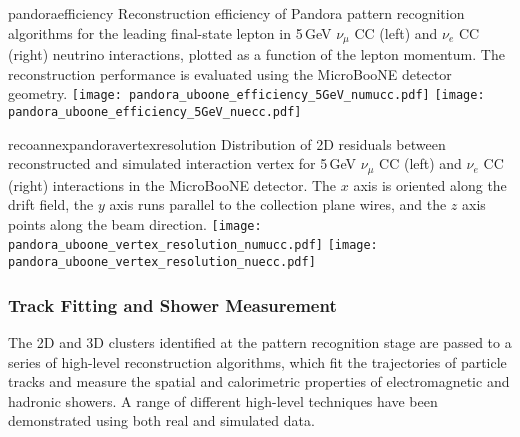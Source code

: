 \begin{cdrfigure}{pandoraefficiency}
{Reconstruction efficiency of Pandora pattern recognition algorithms
 for the leading final-state lepton in 5\,GeV $\nu_{\mu}$ CC (left) and
 $\nu_{e}$ CC (right) neutrino interactions, plotted as a function of
 the lepton momentum. The reconstruction performance is evaluated
 using the MicroBooNE detector geometry. }
\texttt{[image: pandora\_uboone\_efficiency\_5GeV\_numucc.pdf]}
\texttt{[image: pandora\_uboone\_efficiency\_5GeV\_nuecc.pdf]}
\end{cdrfigure}

\begin{cdrfigure}{recoannexpandoravertexresolution}
{Distribution of 2D residuals between reconstructed and simulated interaction
 vertex for 5\,GeV $\nu_{\mu}$ CC (left) and $\nu_{e}$ CC (right) interactions in the MicroBooNE detector.
 The $x$ axis is oriented along the drift field, the $y$ axis runs parallel 
 to the collection plane wires, and the $z$ axis points along the beam direction.}
\texttt{[image: pandora\_uboone\_vertex\_resolution\_numucc.pdf]}
\texttt{[image: pandora\_uboone\_vertex\_resolution\_nuecc.pdf]}
\end{cdrfigure}


\subsubsection{Track Fitting and Shower Measurement}



The 2D and 3D clusters identified at the pattern recognition stage
are passed to a series of high-level reconstruction algorithms,
which fit the trajectories of particle tracks and measure the
spatial and calorimetric properties of electromagnetic and hadronic showers.
A range of different high-level techniques have been demonstrated 
using both real and simulated data.

